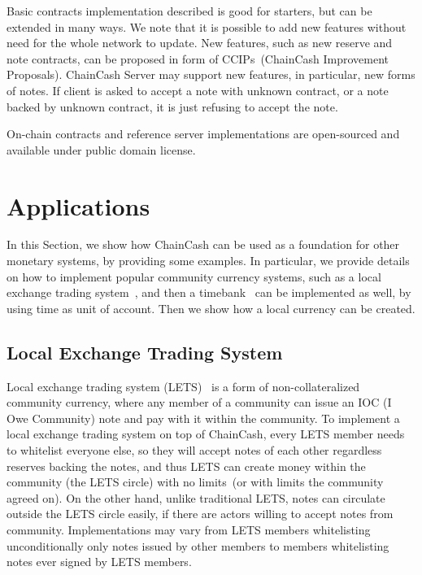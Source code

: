 \documentclass{llncs}   %
\newcommand{\cc}{ChainCash}
\begin{document}

Basic contracts implementation described is good for starters, but can be extended in many ways.  We note that it is possible
to add new features without need for the whole network to update. New features, such as new reserve and note contracts,
can be proposed in form of CCIPs~(ChainCash Improvement Proposals). ChainCash
Server may support new features, in particular, new forms of notes. If client is asked to accept a note with unknown
contract, or a note backed by unknown contract, it is just refusing to accept the note.

On-chain contracts and reference server implementations are open-sourced and available under public domain license.

\section{Applications}
\label{sec-apps}

In this Section, we show how \cc{} can be used as a foundation for other monetary systems, by providing some examples.
In particular, we provide details on how to implement popular community currency systems, such as a local exchange trading
 system~\cite{williams1996new}, and then a timebank~\cite{mcquaid2004review} can be implemented as well, by using time
as unit of account. Then we show how a local currency can be created.

\subsection{Local Exchange Trading System}

Local exchange trading system (LETS)~\cite{williams1996new} is a form of non-collateralized community currency, where any member of a community
can issue an IOC (I Owe Community) note and pay with it within the community.
To implement a local exchange trading system on top of \cc{}, every LETS member needs to whitelist everyone else, so
they will accept notes of each other regardless reserves backing the notes, and thus LETS can create money within the community (the LETS circle) with no limits~(or with limits the community agreed on). On the other hand, unlike traditional LETS, notes can circulate outside the LETS circle easily, if there are actors willing to accept notes from community. Implementations may vary from LETS members whitelisting unconditionally only notes issued by other members to members whitelisting notes ever signed by LETS members.
\end{document}
